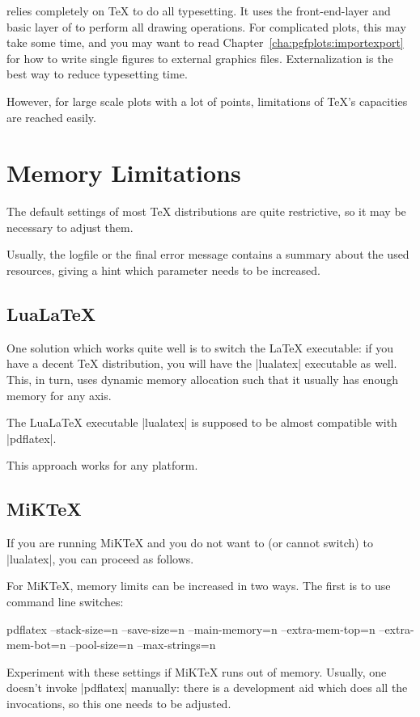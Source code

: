{\PGFPlots{} relies completely on \TeX{} to do all typesetting. It uses the
front-end-layer and basic layer of \PGF{} to perform all drawing operations.
For complicated plots, this may take some time, and you may want to read
Chapter~\ref{cha:pgfplots:importexport} for how to write single figures to
external graphics files. Externalization is the best way to reduce typesetting
time.

However, for large scale plots with a lot of points, limitations of \TeX's
capacities are reached easily.


\section[memorylimits]{Memory Limitations}

The default settings of most \TeX{} distributions are quite restrictive, so it
may be necessary to adjust them.

Usually, the logfile or the final error message contains a summary about the
used resources, giving a hint which parameter needs to be increased.


\subsection{Lua\LaTeX{}}

One solution which works quite well is to switch the \LaTeX{} executable: if
you have a decent \TeX{} distribution, you will have the |lualatex| executable
as well. This, in turn, uses dynamic memory allocation such that it usually has
enough memory for any \PGFPlots{} axis.

The Lua\LaTeX{} executable |lualatex| is supposed to be almost compatible with
|pdflatex|.

This approach works for any platform.


\subsection{MiK\TeX{}}

If you are running MiK\TeX{} and you do not want to (or cannot switch) to
|lualatex|, you can proceed as follows.

For MiK\TeX{}, memory limits can be increased in two ways. The first is to use
command line switches:
%
\begin{codeexample}
pdflatex
    --stack-size=n --save-size=n
    --main-memory=n --extra-mem-top=n --extra-mem-bot=n
    --pool-size=n --max-strings=n
\end{codeexample}
%
\noindent Experiment with these settings if MiK\TeX{} runs out of memory.
Usually, one doesn't invoke |pdflatex| manually: there is a development aid
which does all the invocations, so this one needs to be adjusted.

}
